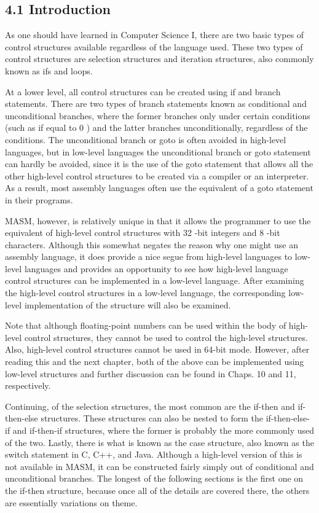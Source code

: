 \documentclass[10pt]{article}
\begin{document}
\subsection*{4.1 Introduction}
As one should have learned in Computer Science I, there are two basic types of control structures available regardless of the language used. These two types of control structures are selection structures and iteration structures, also commonly known as ifs and loops.

At a lower level, all control structures can be created using if and branch statements. There are two types of branch statements known as conditional and unconditional branches, where the former branches only under certain conditions (such as if equal to 0 ) and the latter branches unconditionally, regardless of the conditions. The unconditional branch or goto is often avoided in high-level languages, but in low-level languages the unconditional branch or goto statement can hardly be avoided, since it is the use of the goto statement that allows all the other high-level control structures to be created via a compiler or an interpreter. As a result, most assembly languages often use the equivalent of a goto statement in their programs.

MASM, however, is relatively unique in that it allows the programmer to use the equivalent of high-level control structures with 32 -bit integers and 8 -bit characters. Although this somewhat negates the reason why one might use an assembly language, it does provide a nice segue from high-level languages to low-level languages and provides an opportunity to see how high-level language control structures can be implemented in a low-level language. After examining the high-level control structures in a low-level language, the corresponding low-level implementation of the structure will also be examined.

Note that although floating-point numbers can be used within the body of high-level control structures, they cannot be used to control the high-level structures. Also, high-level control structures cannot be used in 64-bit mode. However, after reading this and the next chapter, both of the above can be implemented using low-level structures and further discussion can be found in Chaps. 10 and 11, respectively.

Continuing, of the selection structures, the most common are the if-then and if-then-else structures. These structures can also be nested to form the if-then-else-if and if-then-if structures, where the former is probably the more commonly used of the two. Lastly, there is what is known as the case structure, also known as the switch statement in C, C++, and Java. Although a high-level version of this is not available in MASM, it can be constructed fairly simply out of conditional and unconditional branches. The longest of the following sections is the first one on the if-then structure, because once all of the details are covered there, the others are essentially variations on theme.
\end{document}
